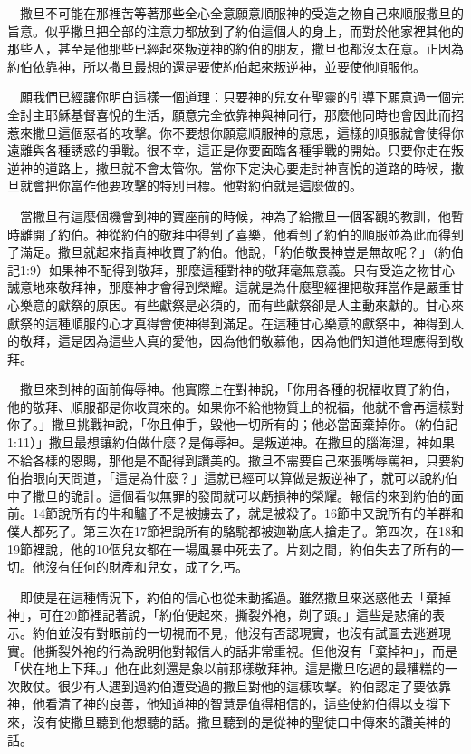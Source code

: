 \documentclass{book}
\begin{document}
　撒旦不可能在那裡苦等著那些全心全意願意順服神的受造之物自己來順服撒旦的旨意。似乎撒旦把全部的注意力都放到了約伯這個人的身上，而對於他家裡其他的那些人，甚至是他那些已經起來叛逆神的約伯的朋友，撒旦也都沒太在意。正因為約伯依靠神，所以撒旦最想的還是要使約伯起來叛逆神，並要使他順服他。

　願我們已經讓你明白這樣一個道理：只要神的兒女在聖靈的引導下願意過一個完全討主耶穌基督喜悅的生活，願意完全依靠神與神同行，那麼他同時也會因此而招惹來撒旦這個惡者的攻擊。你不要想你願意順服神的意思，這樣的順服就會使得你遠離與各種誘惑的爭戰。很不幸，這正是你要面臨各種爭戰的開始。只要你走在叛逆神的道路上，撒旦就不會太管你。當你下定決心要走討神喜悅的道路的時候，撒旦就會把你當作他要攻擊的特別目標。他對約伯就是這麼做的。

　當撒旦有這麼個機會到神的寶座前的時候，神為了給撒旦一個客觀的教訓，他暫時離開了約伯。神從約伯的敬拜中得到了喜樂，他看到了約伯的順服並為此而得到了滿足。撒旦就起來指責神收買了約伯。他說，「約伯敬畏神豈是無故呢？」（約伯記1:9）如果神不配得到敬拜，那麼這種對神的敬拜毫無意義。只有受造之物甘心誠意地來敬拜神，那麼神才會得到榮耀。這就是為什麼聖經裡把敬拜當作是嚴重甘心樂意的獻祭的原因。有些獻祭是必須的，而有些獻祭卻是人主動來獻的。甘心來獻祭的這種順服的心才真得會使神得到滿足。在這種甘心樂意的獻祭中，神得到人的敬拜，這是因為這些人真的愛他，因為他們敬慕他，因為他們知道他理應得到敬拜。

　撒旦來到神的面前侮辱神。他實際上在對神說，「你用各種的祝福收買了約伯，他的敬拜、順服都是你收買來的。如果你不給他物質上的祝福，他就不會再這樣對你了。」撒旦挑戰神說，「你且伸手，毀他一切所有的；他必當面棄掉你。（約伯記1:11）」撒旦最想讓約伯做什麼？是侮辱神。是叛逆神。在撒旦的腦海浬，神如果不給各樣的恩賜，那他是不配得到讚美的。撒旦不需要自己來張嘴辱罵神，只要約伯抬眼向天問道，「這是為什麼？」這就已經可以算做是叛逆神了，就可以說約伯中了撒旦的詭計。這個看似無罪的發問就可以虧損神的榮耀。報信的來到約伯的面前。14節說所有的牛和驢子不是被擄去了，就是被殺了。16節中又說所有的羊群和僕人都死了。第三次在17節裡說所有的駱駝都被迦勒底人搶走了。第四次，在18和19節裡說，他的10個兒女都在一場風暴中死去了。片刻之間，約伯失去了所有的一切。他沒有任何的財產和兒女，成了乞丐。

　即使是在這種情況下，約伯的信心也從未動搖過。雖然撒旦來迷惑他去「棄掉神」，可在20節裡記著說，「約伯便起來，撕裂外袍，剃了頭。」這些是悲痛的表示。約伯並沒有對眼前的一切視而不見，他沒有否認現實，也沒有試圖去逃避現實。他撕裂外袍的行為說明他對報信人的話非常重視。但他沒有「棄掉神」，而是「伏在地上下拜。」他在此刻還是象以前那樣敬拜神。這是撒旦吃過的最糟糕的一次敗仗。很少有人遇到過約伯遭受過的撒旦對他的這樣攻擊。約伯認定了要依靠神，他看清了神的良善，他知道神的智慧是值得相信的，這些使約伯得以支撐下來，沒有使撒旦聽到他想聽的話。撒旦聽到的是從神的聖徒口中傳來的讚美神的話。
\end{document}

